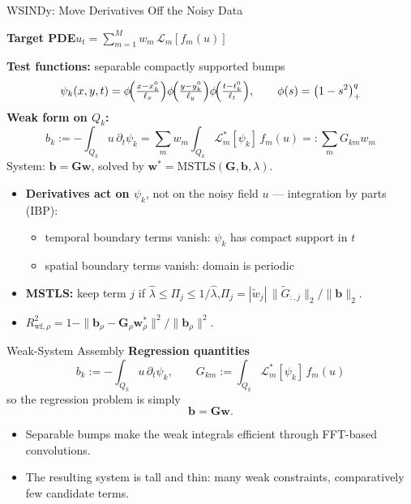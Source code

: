 
\begin{frame}[shrink=24]{WSINDy: Move Derivatives Off the Noisy Data}
\normalsize

\textbf{Target PDE}\quad $u_t=\sum_{m=1}^{M} w_m\,\mathcal{L}_m[f_m(u)]$

\smallskip
\textbf{Test functions:} separable compactly supported bumps
\[
  \psi_k(x,y,t)=\phi\!\Bigl(\tfrac{x-x_k^0}{\ell_x}\Bigr)\phi\!\Bigl(\tfrac{y-y_k^0}{\ell_y}\Bigr)\phi\!\Bigl(\tfrac{t-t_k^0}{\ell_t}\Bigr),
  \qquad \phi(s)=\bigl(1-s^2\bigr)_+^q
\]
\textbf{Weak form on $Q_k$:}
\[
  b_k := -\int_{Q_k} u\,\partial_t\psi_k
  = \sum_{m}w_m\!\int_{Q_k}\!\mathcal{L}_m^*[\psi_k]\,f_m(u) =: \sum_m G_{km}w_m
\]
System: $\mathbf{b}=\mathbf{G}\mathbf{w}$, solved by $\mathbf{w}^*=\mathrm{MSTLS}(\mathbf{G},\mathbf{b},\lambda)$.

\smallskip
\begin{itemize}
  \item \textbf{Derivatives act on $\psi_k$}, not on the noisy field $u$ --- integration by parts (IBP):
  \begin{itemize}
    \item[$\circ$] temporal boundary terms vanish: $\psi_k$ has compact support in $t$
    \item[$\circ$] spatial boundary terms vanish: domain is periodic
  \end{itemize}
  \item \textbf{MSTLS:} keep term $j$ if $\hat\lambda\le\Pi_j\le 1/\hat\lambda$,\quad $\Pi_j = |\tilde{w}_j|\,\|\tilde{G}_{:,j}\|_2/\|\mathbf{b}\|_2$.
  \item $R^2_{\mathrm{wf},\rho} = 1 - \|\mathbf{b}_\rho - \mathbf{G}_\rho\mathbf{w}^*_\rho\|^2 / \|\mathbf{b}_\rho\|^2$.
\end{itemize}
\end{frame}

\iffalse
\begin{frame}[shrink=4]{Weak-System Assembly}
\footnotesize
\textbf{Regression quantities}
\[
  b_k := -\int_{Q_k} u\,\partial_t\psi_k,
  \qquad
  G_{km}:=\int_{Q_k}\mathcal{L}_m^*[\psi_k]\,f_m(u)
\]
so the regression problem is simply
\[
  \mathbf{b}=\mathbf{G}\mathbf{w}.
\]

\smallskip
\begin{itemize}
  \item Separable bumps make the weak integrals efficient through FFT-based convolutions.
  \item The resulting system is tall and thin: many weak constraints, comparatively few candidate terms.
\end{itemize}
\end{frame}

